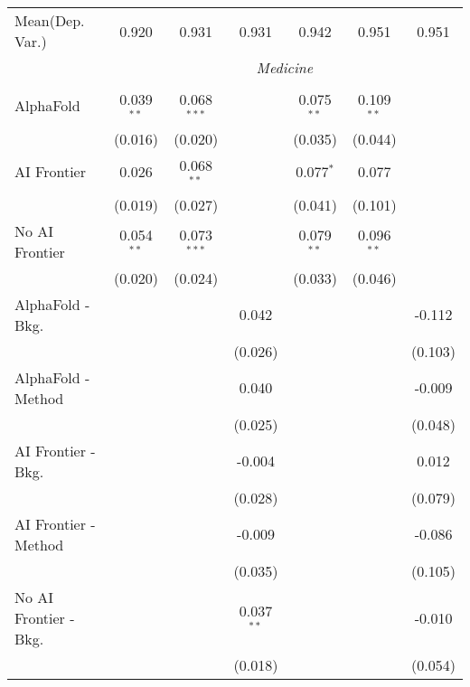 \begin{tabular}{lcccccc}
Mean(Dep. Var.) & 0.920 & 0.931 & 0.931 & 0.942 & 0.951 & 0.951 \\
 & \multicolumn{6}{c}{\textit{Medicine}} \\ \\
   AlphaFold               & 0.039$^{**}$ & 0.068$^{***}$ &               & 0.075$^{**}$ & 0.109$^{**}$ &   \\   
                           & (0.016)      & (0.020)       &               & (0.035)      & (0.044)      &   \\   
   AI Frontier             & 0.026        & 0.068$^{**}$  &               & 0.077$^{*}$  & 0.077        &   \\   
                           & (0.019)      & (0.027)       &               & (0.041)      & (0.101)      &   \\   
   No AI Frontier          & 0.054$^{**}$ & 0.073$^{***}$ &               & 0.079$^{**}$ & 0.096$^{**}$ &   \\   
                           & (0.020)      & (0.024)       &               & (0.033)      & (0.046)      &   \\   
   AlphaFold - Bkg.        &              &               & 0.042         &              &              & -0.112\\   
                           &              &               & (0.026)       &              &              & (0.103)\\   
   AlphaFold - Method      &              &               & 0.040         &              &              & -0.009\\   
                           &              &               & (0.025)       &              &              & (0.048)\\   
   AI Frontier - Bkg.      &              &               & -0.004        &              &              & 0.012\\   
                           &              &               & (0.028)       &              &              & (0.079)\\   
   AI Frontier - Method    &              &               & -0.009        &              &              & -0.086\\   
                           &              &               & (0.035)       &              &              & (0.105)\\   
   No AI Frontier - Bkg.   &              &               & 0.037$^{**}$  &              &              & -0.010\\   
                           &              &               & (0.018)       &              &              & (0.054)\\   

\end{tabular}
